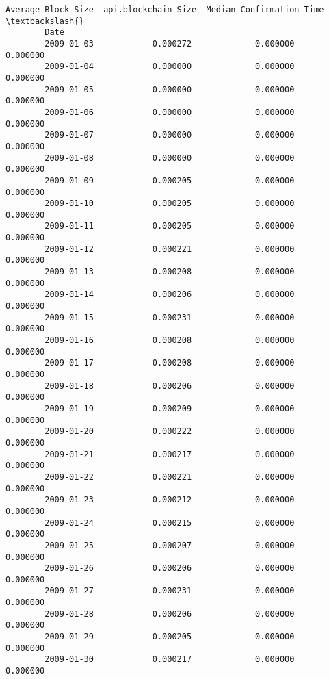 \documentclass[11pt]{article}
\begin{document}
\begin{Verbatim}[commandchars=\\\{\}]
                    Average Block Size  api.blockchain Size  Median Confirmation Time  \textbackslash{}
        Date                                                                            
        2009-01-03            0.000272             0.000000                  0.000000   
        2009-01-04            0.000000             0.000000                  0.000000   
        2009-01-05            0.000000             0.000000                  0.000000   
        2009-01-06            0.000000             0.000000                  0.000000   
        2009-01-07            0.000000             0.000000                  0.000000   
        2009-01-08            0.000000             0.000000                  0.000000   
        2009-01-09            0.000205             0.000000                  0.000000   
        2009-01-10            0.000205             0.000000                  0.000000   
        2009-01-11            0.000205             0.000000                  0.000000   
        2009-01-12            0.000221             0.000000                  0.000000   
        2009-01-13            0.000208             0.000000                  0.000000   
        2009-01-14            0.000206             0.000000                  0.000000   
        2009-01-15            0.000231             0.000000                  0.000000   
        2009-01-16            0.000208             0.000000                  0.000000   
        2009-01-17            0.000208             0.000000                  0.000000   
        2009-01-18            0.000206             0.000000                  0.000000   
        2009-01-19            0.000209             0.000000                  0.000000   
        2009-01-20            0.000222             0.000000                  0.000000   
        2009-01-21            0.000217             0.000000                  0.000000   
        2009-01-22            0.000221             0.000000                  0.000000   
        2009-01-23            0.000212             0.000000                  0.000000   
        2009-01-24            0.000215             0.000000                  0.000000   
        2009-01-25            0.000207             0.000000                  0.000000   
        2009-01-26            0.000206             0.000000                  0.000000   
        2009-01-27            0.000231             0.000000                  0.000000   
        2009-01-28            0.000206             0.000000                  0.000000   
        2009-01-29            0.000205             0.000000                  0.000000   
        2009-01-30            0.000217             0.000000                  0.000000   

\end{Verbatim}
\end{document}
